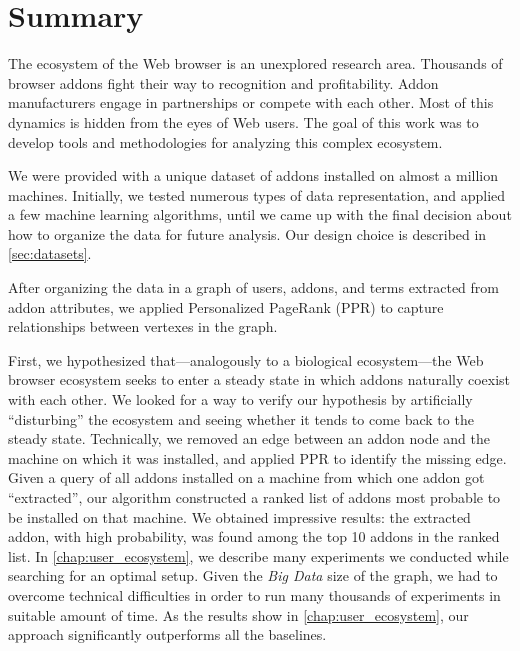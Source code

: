 \documentclass[ijoc,nonblindrev]{informs3} %
\numberwithin{equation}{subsection}
\begin{document}
\section{Summary}
\label{chap:summary}

The ecosystem of the Web browser is an unexplored research area. Thousands of browser addons fight their way to recognition and profitability. Addon manufacturers engage in partnerships or compete with each other. Most of this dynamics is hidden from the eyes of Web users. The goal of this work was to develop tools and methodologies for analyzing this complex ecosystem.

We were provided with a unique dataset of addons installed on almost a million machines. Initially, we tested numerous types of data representation, and applied a few machine learning algorithms, until we came up with the final decision about how to organize the data for future analysis. Our design choice is described in \autoref{sec:datasets}.

After organizing the data in a graph of users, addons, and terms extracted from addon attributes, we applied Personalized PageRank (PPR) to capture relationships between vertexes in the graph.

First, we hypothesized that---analogously to a biological ecosystem---the Web browser ecosystem seeks to enter a steady state in which addons naturally coexist with each other. We looked for a way to verify our hypothesis by artificially ``disturbing'' the ecosystem and seeing whether it tends to come back to the steady state. Technically, we removed an edge between an addon node and the machine on which it was installed, and applied PPR to identify the missing edge. Given a query of all addons installed on a machine from which one addon got ``extracted'', our algorithm constructed a ranked list of addons most probable to be installed on that machine. We obtained impressive results: the extracted addon, with high probability, was found among the top 10 addons in the ranked list. In \autoref{chap:user_ecosystem}, we describe many experiments we conducted while searching for an optimal setup. Given the \emph{Big Data} size of the graph, we had to overcome technical difficulties in order to run many thousands of experiments in suitable amount of time. As the results show in \autoref{chap:user_ecosystem}, our approach significantly outperforms all the baselines.
\end{document}
